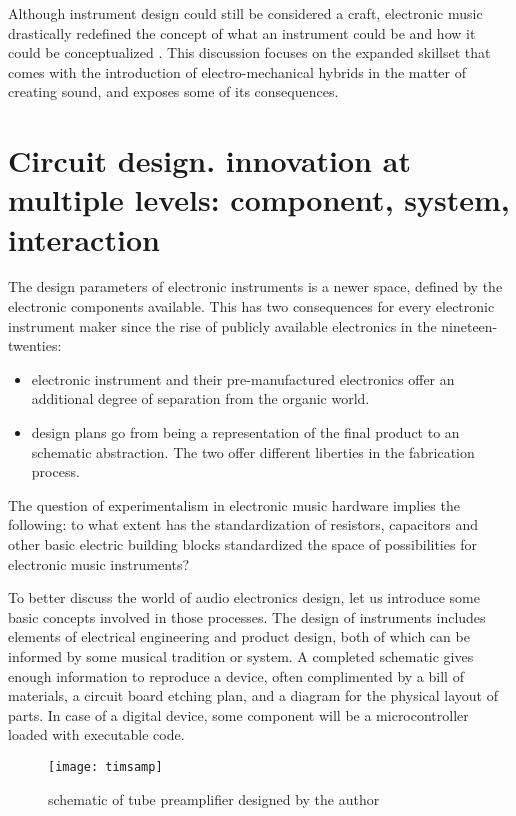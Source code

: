 	Although instrument design could still be considered a craft, electronic music drastically redefined the concept of what an instrument could be and how it could be conceptualized \cite{pinch2002}. This discussion focuses on the expanded skillset that comes with the introduction of electro-mechanical hybrids in the matter of creating sound, and exposes some of its consequences. 

\section{Circuit design. innovation at multiple levels: component, system, interaction}

The design parameters of electronic instruments is a newer space, defined by the electronic components available. This has two consequences for every electronic instrument maker since the rise of publicly available electronics in the nineteen-twenties:

\begin{itemize}
	\item electronic instrument and their pre-manufactured electronics offer an additional degree of separation from the organic world. 
	\item design plans go from being a representation of the final product to an schematic abstraction. The two offer different liberties in the fabrication process.
\end{itemize}
	
The question of experimentalism in electronic music hardware implies the following: to what extent has the standardization of resistors, capacitors and other basic electric building blocks standardized the space of possibilities for electronic music instruments?

To better discuss the world of audio electronics design, let us introduce some basic concepts involved in those processes. The design of instruments includes elements of electrical engineering and product design, both of which can be informed by some musical tradition or system. A completed schematic gives enough information to reproduce a device, often complimented by a bill of materials, a circuit board etching plan, and a diagram for the physical layout of parts. In case of a digital device, some component will be a microcontroller loaded with executable code. 

\begin{figure}[h!]
  \caption{schematic of tube preamplifier designed by the author}
  \centering
    \texttt{[image: timsamp]}
\end{figure}

